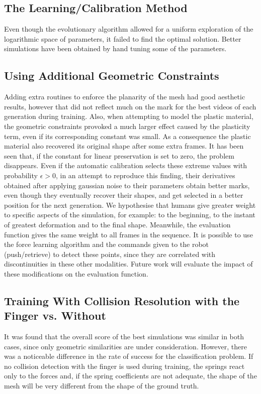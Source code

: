 \documentclass[journal]{IEEEtran}
\newcounter{algorithm}
\newcommand{\comment}[1]{{\color{red} #1}}
\begin{document}
\subsection{The Learning/Calibration Method}
Even though the evolutionary algorithm allowed for a uniform exploration of the logarithmic space of parameters, it failed to find the optimal solution.  Better simulations have been obtained by hand tuning some of the parameters.  %

\subsection{Using \comment{Additional} Geometric Constraints}
Adding extra routines to enforce the planarity of the mesh had good aesthetic results, however that did not reflect much on the mark for the best videos of each generation during training.   \comment{Also, when attempting to model the plastic material, the geometric constraints provoked a much larger effect caused by the plasticity term}, even if its corresponding constant was small.  As a consequence the plastic material also recovered its original shape after some extra frames.  It has been seen that, if the constant for linear preservation is set to zero, the problem disappears.  Even if the automatic calibration selects these extreme values with probability $\epsilon>0$, in an attempt to reproduce this finding, their derivatives obtained after applying gaussian noise to their parameters obtain better marks, even though they eventually recover their shapes, and get selected in a better position for the next generation.  We hypothesise that humans give greater weight to specific aspects of the simulation, for example: to the beginning, to the instant of greatest deformation and to the final shape.  Meanwhile, the evaluation function gives the same weight to all frames in the sequence.  It is possible to use the force learning algorithm and the commands given to the robot (push/retrieve) to detect these points, since they are correlated with discontinuities in these other modalities.  Future work will evaluate the impact of these modifications on the evaluation function.

\subsection{Training With Collision Resolution with the Finger vs. Without}
It was found that the overall score of the best simulations was similar in both cases, since only geometric similarities are under consideration.  However, there was a noticeable difference in the rate of success for the classification problem.  If no collision detection with the finger is used during training, the springs react only to the forces and, if the spring coefficients are not adequate, the shape of the mesh will be very different from the shape of the ground truth.
\end{document}
